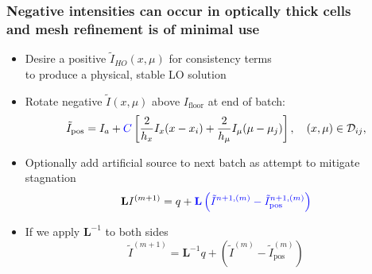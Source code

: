 \documentclass[xcolor=dvipsnames,hyperref={pdfpagelabels=false},unknownkeysallowed]{beamer}
\newcommand{\colb}[1]{{\color{blue} #1}}
\newcommand{\colG}[1]{{\color{Gray!110} #1}}
\newlength{\wideitemsep}
\let\olditem\item
\renewcommand{\item}{\setlength{\itemsep}{\wideitemsep}\olditem}
\newcommand{\B}[1]{\ensuremath{\mathbf{#1}}}
\begin{document}
\begin{frame}
    \frametitle{Negative intensities can occur in optically thick cells \\
    \colG{and mesh refinement is of minimal use}}

    {\addtolength\wideitemsep{5pt}
    \begin{itemize}
        \item  Desire a positive $\tilde I_{HO}(x,\mu)$ for consistency terms \\
            \colG{to produce a physical, stable LO solution}
        \item \colb{Rotate} negative $\tilde I(x,\mu)$ above $I_{\text{floor}}$  at end of batch:
\begin{equation*}
    \tilde I_{\text{pos}} = I_{a} + \colb{C}\left[\frac{2}{h_x}I_x(x-x_i) +
    \frac{2}{h_\mu}I_\mu(\mu-\mu_j)\right],\quad     (x,\mu) \in \mathcal{D}_{ij},
\end{equation*}\pause
        \item Optionally add artificial \colb{source} to next batch as attempt to mitigate stagnation
            \begin{equation*}
                \B L I^{(m+1)} = q + \colb{ \mathbf{L}\left(\tilde{I}^{n+1,(m)} -
                \tilde{I}^{n+1,(m)}_{\text{pos}}\right)}
            \end{equation*}
            \vspace{-0.3in}
        \item[] If we apply $\B L^{-1}$ to both sides
\begin{equation*}
    \tilde I^{(m+1)} = \B L^{-1} q + (\tilde{I}^{(m)} -
    \tilde{I}^{(m)}_{\text{pos}})
\end{equation*}
    \end{itemize}
}
\end{frame}
\end{document}
